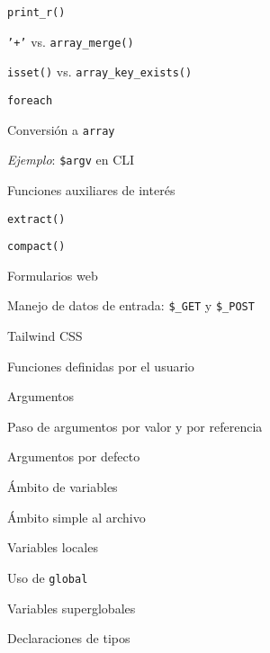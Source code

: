 \begin{longenum}
\begin{longenum}
\begin{longenum}
\begin{longenum}
                \item \texttt{print\_r()}
                \item \texttt{'+'} vs. \texttt{array\_merge()}
                \item \texttt{isset()} vs. \texttt{array\_key\_exists()}
            \end{longenum}
            \item \texttt{foreach}
            \item Conversión a \texttt{array}
            \item \textit{Ejemplo}: \texttt{\$argv} en CLI
            \item Funciones auxiliares de interés
            \begin{longenum}
                \item \texttt{extract()}
                \item \texttt{compact()}
            \end{longenum}
        \end{longenum}
        \item Formularios web
        \begin{longenum}
            \item Manejo de datos de entrada: \texttt{\$\_GET} y \texttt{\$\_POST}
            \item Tailwind CSS
        \end{longenum}
        \item Funciones definidas por el usuario
        \begin{longenum}
            \item Argumentos
            \begin{longenum}
                \item Paso de argumentos por valor y por referencia
                \item Argumentos por defecto
            \end{longenum}
            \item Ámbito de variables
            \begin{longenum}
                \item Ámbito simple al archivo
                \item Variables locales
                \item Uso de \texttt{global}
                \item Variables superglobales
            \end{longenum}
            \item Declaraciones de tipos

\end{longenum}
\end{longenum}
\end{longenum}
